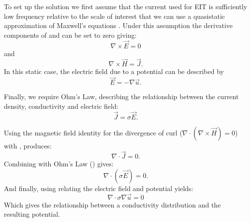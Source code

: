 To set up the solution we first assume that the current used for EIT is sufficiently low 
frequency relative to the scale of interest that we can use a 
quasistatic approximation of Maxwell's equations \parencite{larsson_electromagnetics_2007}. 
Under this assumption the derivative components of  and 
can be set to zero giving:
\begin{equation}
\nabla \times \vec{E} = 0
\end{equation}
and
\begin{equation} \label{eq:amp2}
\nabla \times \vec{H} = \vec{J}.
\end{equation}
In this static case, the electric field due to a potential can be described by 
\begin{equation} \label{eq:field}
	\vec{E} = -\nabla\vec{u}.
\end{equation}

Finally, we require Ohm's Law, describing the relationship between the current density,
conductivity and electric field:
\begin{equation} \label{eq:ohm}
	\vec{J} = \sigma \vec{E}.
\end{equation}

Using the magnetic field identity for the divergence of curl 
($ \nabla \cdot (\nabla \times \vec{H}) = 0 $) with , produces:
\begin{equation} \label{eq:mid1}
	\nabla \cdot \vec{J} = 0.
\end{equation}
Combining  with Ohm's Law () gives: 
\begin{equation} \label{eq:mid2}
	\nabla \cdot (\sigma \vec{E}) = 0.
\end{equation}
And finally, using  relating the electric field and potential 
yields: 
\begin{equation}
	\nabla \cdot \sigma \nabla \vec{u} = 0
\end{equation}
Which gives the relationship between a conductivity distribution and the resulting 
potential. 


